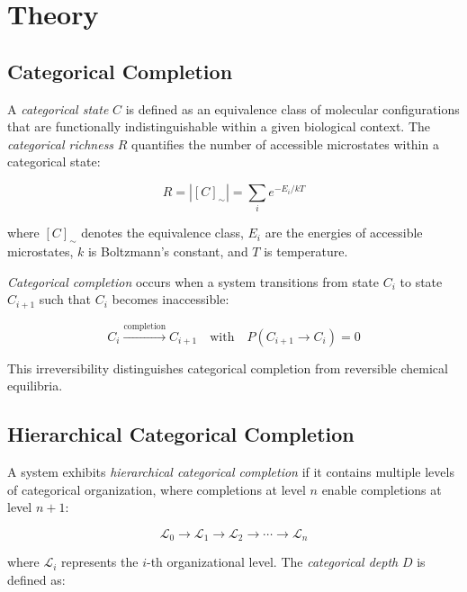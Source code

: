 \documentclass[11pt]{article}
\begin{document}
\section{Theory}

\subsection{Categorical Completion}

A \textit{categorical state} $C$ is defined as an equivalence class of molecular configurations that are functionally indistinguishable within a given biological context. The \textit{categorical richness} $R$ quantifies the number of accessible microstates within a categorical state:

\begin{equation}
R = |[C]_{\sim}| = \sum_{i} e^{-E_i/kT}
\end{equation}

where $[C]_{\sim}$ denotes the equivalence class, $E_i$ are the energies of accessible microstates, $k$ is Boltzmann's constant, and $T$ is temperature.

\textit{Categorical completion} occurs when a system transitions from state $C_i$ to state $C_{i+1}$ such that $C_i$ becomes inaccessible:

\begin{equation}
C_i \xrightarrow{\text{completion}} C_{i+1} \quad \text{with} \quad P(C_{i+1} \rightarrow C_i) = 0
\end{equation}

This irreversibility distinguishes categorical completion from reversible chemical equilibria.

\subsection{Hierarchical Categorical Completion}

A system exhibits \textit{hierarchical categorical completion} if it contains multiple levels of categorical organization, where completions at level $n$ enable completions at level $n+1$:

\begin{equation}
\mathcal{L}_0 \rightarrow \mathcal{L}_1 \rightarrow \mathcal{L}_2 \rightarrow \cdots \rightarrow \mathcal{L}_n
\end{equation}

where $\mathcal{L}_i$ represents the $i$-th organizational level. The \textit{categorical depth} $D$ is defined as:
\end{document}
